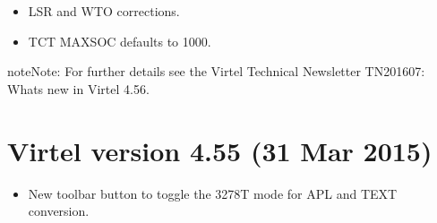 \documentclass[letterpaper,10pt,english]{sphinxmanual}
\begin{document}
\sphinxAtStartPar
{}
\begin{itemize}
\item {} 
\sphinxAtStartPar
LSR and WTO corrections.

\item {} 
\sphinxAtStartPar
TCT MAXSOC defaults to 1000.

\end{itemize}

\begin{sphinxadmonition}{note}{Note:}
\sphinxAtStartPar
For further details see the Virtel Technical Newsletter TN201607: Whats new in Virtel 4.56.
\end{sphinxadmonition}


\section{Virtel version 4.55 (31 Mar 2015)}
\label{\detokenize{Installation_Guide:virtel-version-4-55-31-mar-2015}}
\sphinxAtStartPar
{}
\begin{itemize}
\item {} 
\sphinxAtStartPar
New toolbar button to toggle the 3278T mode for APL and TEXT conversion.

\end{itemize}
\end{document}
